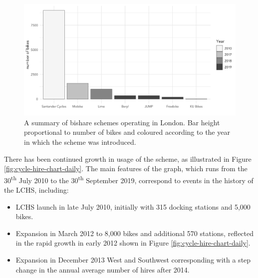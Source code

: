 \documentclass[]{article}
\providecommand{\tightlist}{%
  \setlength{\itemsep}{0pt}\setlength{\parskip}{0pt}}
\begin{document}
\begin{figure}

{\centering \includegraphics[width=0.7\linewidth]{figures/london-bike-hire-players} 

}

\caption{A summary of bishare schemes operating in London. Bar height proportional to number of bikes and coloured according to the year in which the scheme was introduced.}\label{fig:cycle-hire-players}
\end{figure}

There has been continued growth in usage of the scheme, as illustrated in Figure \ref{fig:cycle-hire-chart-daily}.
The main features of the graph, which runs from the 30\textsuperscript{th} July 2010 to the 30\textsuperscript{th} September 2019, correspond to events in the history of the LCHS, including:

\begin{itemize}
\tightlist
\item
  LCHS launch in late July 2010, initially with 315 docking stations and 5,000 bikes.
\item
  Expansion in March 2012 to 8,000 bikes and additional 570 stations, reflected in the rapid growth in early 2012 shown in Figure \ref{fig:cycle-hire-chart-daily}.
\item
  Expansion in December 2013 West and Southwest
  corresponding with a step change in the annual average number of hires after 2014.
\end{itemize}
\end{document}
